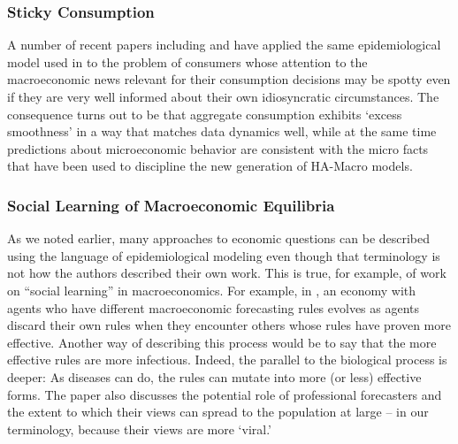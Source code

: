 \subsubsection{Sticky Consumption}

A number of recent papers including \cite{carroll2020sticky} and \cite{auclert2020micro} have applied the same epidemiological model used in \cite{carroll2003macroeconomic} to the problem of consumers whose attention to the macroeconomic news relevant for their consumption decisions may be spotty even if they are very well informed about their own idiosyncratic circumstances.  The consequence turns out to be that aggregate consumption exhibits `excess smoothness' in a way that matches data dynamics well, while at the same time predictions about microeconomic behavior are consistent with the micro facts that have been used to discipline the new generation of HA-Macro models.


\subsubsection{Social Learning of Macroeconomic Equilibria}

As we noted earlier, many approaches to economic questions can be described using the language of epidemiological modeling even though that terminology is not how the authors described their own work.  This is true, for example, of work on ``social learning'' in macroeconomics.  For example, in \cite{arifovic2018learning}, an economy with agents who have different macroeconomic forecasting rules evolves as agents discard their own rules when they encounter others whose rules have proven more effective.  Another way of describing this process would be to say that the more effective rules are more infectious.  Indeed, the parallel to the biological process is deeper: As diseases can do, the rules can mutate into more (or less) effective forms.  The paper also discusses the potential role of professional forecasters and the extent to which their views can spread to the population at large -- in our terminology, because their views are more `viral.'

